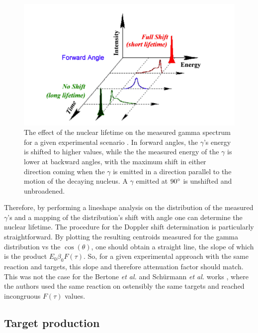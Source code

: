 \begin{figure}
\includegraphics[width=\linewidth]{figures/dopplerEffects.png}
\caption{The effect of the nuclear lifetime on the measured gamma spectrum for a given experimental scenario \cite{Schimpf2011}. In forward angles, the $\gamma$'s energy is shifted to higher values, while the the measured energy of the $\gamma$ is lower at backward angles, with the maximum shift in either direction coming when the $\gamma$ is emitted in a direction parallel to the motion of the decaying nucleus. A $\gamma$ emitted at $90\degree$ is unshifted and unbroadened. }
\label{fig: dopplerShift}
\end{figure}

Therefore, by performing a lineshape analysis on the distribution of the measured $\gamma$'s and a mapping of the distribution's shift with angle one can determine the nuclear lifetime. The procedure for the Doppler shift determination is particularly straightforward. By plotting the resulting centroids measured for the gamma distribution vs the $\cos(\theta)$, one should obtain a straight line, the slope of which is the product $E_{0} \beta_{0} F(\tau)$. So, for a given experimental approach with the same reaction and targets, this slope and therefore attenuation factor should match. This was not the case for the Bertone \textit{et al.} and Sch{\"u}rmann \textit{et al.} works \cite{Bertone2001, Schurmann2008}, where the authors used the same reaction on ostensibly the same targets and reached incongruous $F(\tau)$ values. 
 

\subsection{Target production}
\label{sec: implantation}

